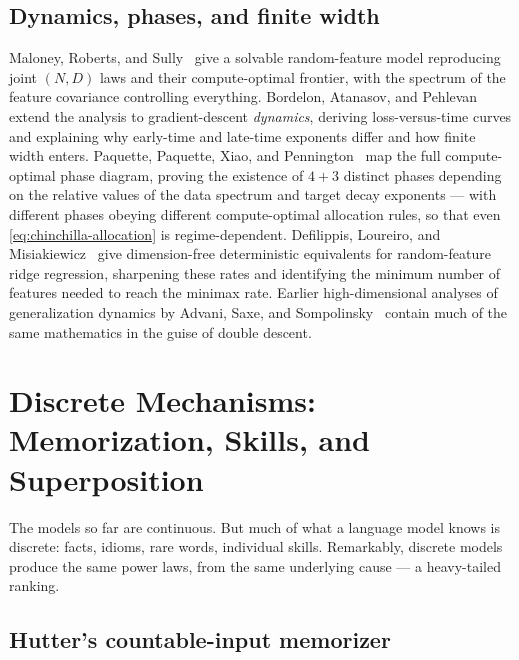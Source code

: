 \documentclass[11pt,a4paper]{article}
\theoremstyle{definition}
\begin{document}
\subsection{Dynamics, phases, and finite width}

Maloney, Roberts, and Sully~\cite{maloney2022solvable} give a solvable random-feature model reproducing joint $(N,D)$ laws and their compute-optimal frontier, with the spectrum of the feature covariance controlling everything. Bordelon, Atanasov, and Pehlevan~\cite{bordelon2024dynamical} extend the analysis to gradient-descent \emph{dynamics}, deriving loss-versus-time curves and explaining why early-time and late-time exponents differ and how finite width enters. Paquette, Paquette, Xiao, and Pennington~\cite{paquette2024phases} map the full compute-optimal phase diagram, proving the existence of $4+3$ distinct phases depending on the relative values of the data spectrum and target decay exponents --- with different phases obeying different compute-optimal allocation rules, so that even \eqref{eq:chinchilla-allocation} is regime-dependent. Defilippis, Loureiro, and Misiakiewicz~\cite{defilippis2024dimension} give dimension-free deterministic equivalents for random-feature ridge regression, sharpening these rates and identifying the minimum number of features needed to reach the minimax rate. Earlier high-dimensional analyses of generalization dynamics by Advani, Saxe, and Sompolinsky~\cite{advani2020high} contain much of the same mathematics in the guise of double descent.

\section{Discrete Mechanisms: Memorization, Skills, and Superposition}
\label{sec:discrete_and_quanta}

The models so far are continuous. But much of what a language model knows is discrete: facts, idioms, rare words, individual skills. Remarkably, discrete models produce the same power laws, from the same underlying cause --- a heavy-tailed ranking.

\subsection{Hutter's countable-input memorizer}
\label{subsec:hutter}
\end{document}
